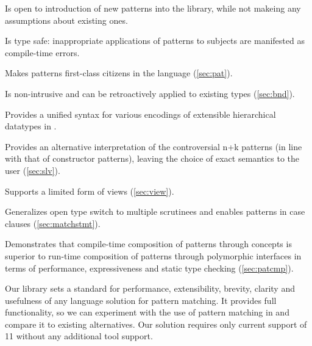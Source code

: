 \begin{compactitem}
\setlength{\itemsep}{0pt}
\setlength{\parskip}{0pt}
  \item Is open to introduction of new patterns into the library, while not 
        makeing any assumptions about existing ones.
  \item Is type safe: inappropriate applications of patterns to subjects are 
        manifested as compile-time errors.
  \item Makes patterns first-class citizens in the language (\textsection\ref{sec:pat}).
  \item Is non-intrusive and can be retroactively applied to existing types (\textsection\ref{sec:bnd}).
\item Provides a unified syntax for various encodings of extensible 
       hierarchical datatypes in \Cpp{}.
  \item Provides an alternative interpretation of the controversial n+k 
        patterns (in line with that of constructor patterns), leaving the choice 
        of exact semantics to the user (\textsection\ref{sec:slv}).
  \item Supports a limited form of views (\textsection\ref{sec:view}).
  \item Generalizes open type switch to multiple scrutinees and enables patterns 
        in case clauses (\textsection\ref{sec:matchstmt}).
  \item Demonstrates that compile-time composition of patterns through 
        concepts is superior to run-time composition of patterns through 
        polymorphic interfaces in terms of performance, expressiveness and 
        static type checking (\textsection\ref{sec:patcmp}).
\end{compactitem}



\noindent
Our library sets a standard for performance, extensibility, brevity, 
clarity and usefulness of any language solution for pattern matching.
It provides full functionality, so we can experiment with the use of 
pattern matching in \Cpp{} and compare it to existing alternatives.
Our solution requires only current support of \Cpp{}11 without any 
additional tool support.

